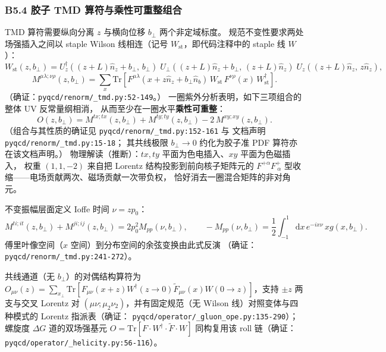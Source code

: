 \documentclass[UTF8]{ctexart}
\begin{document}
\subsubsection{B5.4 胶子 TMD 算符与乘性可重整组合}
TMD 算符需要纵向分离 $z$ 与横向位移 $b_\perp$ 两个非定域标度。
规范不变性要求两处场强插入之间以 staple Wilson 线相连（记号
$W_{\mathrm{st}}$，即代码注释中的 staple 线 $W$）：
\begin{equation}
W_{\mathrm{st}}(z,b_\perp)=U_z^\dagger((z{+}L)\hat n_z+b_\perp,\,b_\perp)\;
U_\perp((z{+}L)\hat n_z+b_\perp,\,(z{+}L)\hat n_z)\;
U_z((z{+}L)\hat n_z,\,z\hat n_z),
\label{eq:stapleline}
\end{equation}
\begin{equation}
M^{\mu\lambda;\nu\rho}(z,b_\perp)=\sum_x\mathrm{Tr}\!\left[
F^{\mu\lambda}(x+z\hat n_z+b_\perp\hat n_b)\,W_{\mathrm{st}}\,
F^{\nu\rho}(x)\,W_{\mathrm{st}}^\dagger\right].
\label{eq:Mdef}
\end{equation}
（确证：\texttt{\nolinkurl{pyqcd/renorm/_tmd.py:52-149}}。）
一圈紫外分析表明，如下三项组合的整体 UV 反常量纲相消，
从而至少在一圈水平\textbf{乘性可重整}：
\begin{equation}
O(z,b_\perp)=M^{tx;tx}(z,b_\perp)+M^{ty;ty}(z,b_\perp)-2\,M^{xy;xy}(z,b_\perp).
\label{eq:Ocombo}
\end{equation}
（组合与其性质的确证见 \texttt{\nolinkurl{pyqcd/renorm/_tmd.py:152-161}} 与
文档声明 \texttt{\nolinkurl{pyqcd/renorm/_tmd.py:15-18}}；
其共线极限 $b_\perp\to0$ 约化为胶子准 PDF 算符亦在该文档声明。）
物理解读（推断）：$tx,ty$ 平面为色电插入、$xy$ 平面为色磁插入，
权重 $(1,1,-2)$ 来自把 Lorentz 结构投影到前向核子矩阵元的
$F^{+\alpha}F^+_{\ \alpha}$ 型收缩——电场贡献两次、磁场贡献一次带负权，
恰好消去一圈混合矩阵的非对角元。

不变振幅层面定义 Ioffe 时间 $\nu=z p_0$：
\begin{equation}
M^{ti;it}(z,b_\perp)+M^{ji;ij}(z,b_\perp)=2p_0^2 M_{pp}(\nu,b_\perp),\qquad
-M_{pp}(\nu,b_\perp)=\frac12\int_{-1}^{1}\!\mathrm{d}x\,e^{-ix\nu}\,x g(x,b_\perp).
\label{eq:Mpp}
\end{equation}
傅里叶像空间（$x$ 空间）到分布空间的余弦变换由此式反演
（确证：\texttt{\nolinkurl{pyqcd/renorm/_tmd.py:241-272}}）。

共线通道（无 $b_\perp$）的对偶结构算符为
$O_{\mu\nu}(z)=\sum_{x_\perp}\mathrm{Tr}[F_{\mu\nu}(x+z)W^\dagger(z\!\to\!0)
\tilde F_{\mu\nu}(x)W(0\!\to\!z)]$，支持 $\pm z$ 两支与交叉 Lorentz 对
$(\mu\nu;\mu_2\nu_2)$，并有固定规范（无 Wilson 线）对照变体与四种模式的
Lorentz 指派表（确证：
\texttt{\nolinkurl{pyqcd/operator/_gluon_ope.py:135-290}}）；
螺旋度 $\Delta G$ 道的双场强基元 $O=\mathrm{Tr}[F\cdot W^\dagger\cdot\tilde F\cdot W]$
同构复用该 roll 链（确证：
\texttt{\nolinkurl{pyqcd/operator/_helicity.py:56-116}}）。
\end{document}
